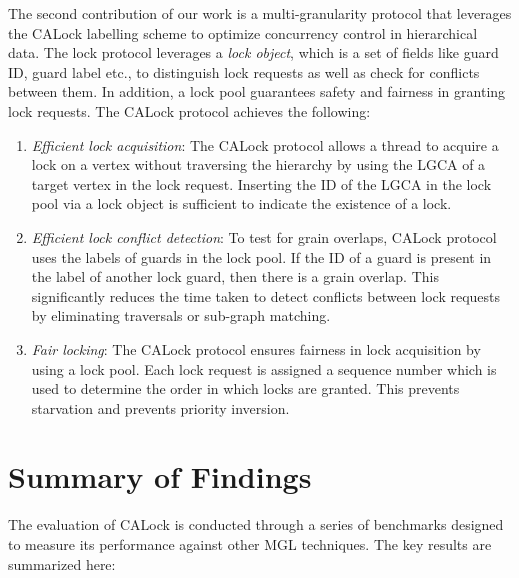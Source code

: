 The second contribution of our work is a multi-granularity protocol that leverages the CALock labelling scheme to optimize concurrency control in hierarchical data. The lock protocol leverages a \emph{lock object}, which is a set of fields like guard ID, guard label etc., to distinguish lock requests as well as check for conflicts between them. In addition, a lock pool guarantees safety and  fairness in granting lock requests. The CALock protocol achieves the following:
\begin{enumerate}
    \item \emph{Efficient lock acquisition}: The CALock protocol allows a thread to acquire a lock on a vertex without traversing the hierarchy by using the LGCA of a target vertex in the lock request. Inserting the ID of the LGCA in the lock pool via a lock object is sufficient to indicate the existence of a lock.
    \item \emph{Efficient lock conflict detection}: To test for grain overlaps, CALock protocol uses the labels of guards in the lock pool. If the ID of a guard is present in the label of another lock guard, then there is a grain overlap. This significantly reduces the time taken to detect conflicts between lock requests by eliminating traversals or sub-graph matching. 
    \item \emph{Fair locking}: The CALock protocol ensures fairness in lock acquisition by using a lock pool. Each lock request is assigned a sequence number which is used to determine the order in which locks are granted. This prevents starvation and prevents priority inversion.
\end{enumerate}




\section{Summary of Findings}
The evaluation of CALock is conducted through a series of benchmarks designed to measure its performance against other MGL techniques. The key results are summarized here:

